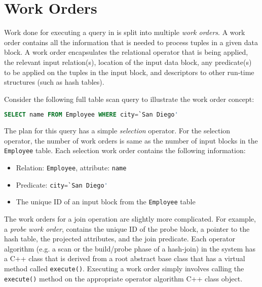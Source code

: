 \section{Work Orders}\label{sec:workorders}
Work done for executing a query in \sys{} is split into multiple \textit{work 
	orders}. %
A work order contains all the information that is needed to process tuples in a given 
data block. 
A work order encapsulates the relational operator that is being applied, the relevant 
input relation(s), location of the input data block, any predicate(s) to be 
applied on the tuples in the input block, and descriptors to other run-time 
structures (such as hash tables).

Consider the following full table scan query to illustrate the work order concept:

\begin{lstlisting}[language=SQL, 
basicstyle=\ttfamily\small, 
showstringspaces=false,
keywordstyle=\color{cardinal}\bfseries, 
emph={San,Diego}, 
emphstyle=\color{bondiblue}\bfseries]
SELECT name FROM Employee WHERE city=`San Diego'
\end{lstlisting}	
\vspace{-0.4em}

The plan for this query has a simple \textit{selection} operator.  
For the selection operator, the number of work orders is same as the number of input blocks in the \verb+Employee+ table. 
Each selection work order contains the following information:
\begin{itemize}
	\itemsep0.1em
	\item {Relation: \verb+Employee+, attribute: \verb|name|}
	\item {Predicate: \lstinline[language=SQL, 
		basicstyle=\ttfamily\small, 
		keywordstyle=\color{cardinal} \bfseries,
		emph={San,Diego}, 
		emphstyle=\color{bondiblue}\bfseries]|city=`San Diego'|}
	\item {The unique ID of an input block from the \verb+Employee+ table}
\end{itemize}

The work orders for a join operation %
are slightly more complicated. 
For example, a \textit{probe work order},  contains the unique ID of the probe 
block, %
a pointer to the hash table, the projected attributes, and the join predicate.
Each operator algorithm (e.g. a scan or the build/probe phase of a hash-join) 
in the system has a C++ class that is derived from a root abstract base class that has a virtual method called \verb|execute()|.
Executing a work order simply involves calling the \verb|execute()| method 
on the appropriate operator algorithm C++ class object. 
